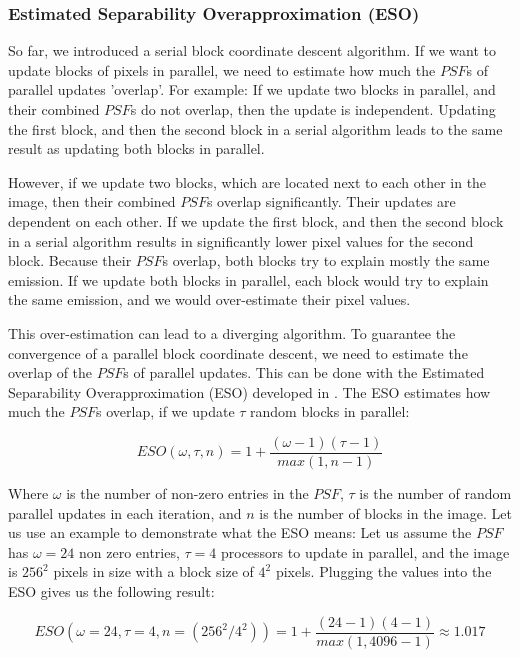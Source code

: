 \subsubsection{Estimated Separability Overapproximation (ESO)} \label{pcdm:pcdm:eso}
So far, we introduced a serial block coordinate descent algorithm. If we want to update blocks of pixels in parallel, we need to estimate how much the $PSF$s of parallel updates 'overlap'. For example: If we update two blocks in parallel, and their combined $PSF$s do not overlap, then the update is independent. Updating the first block, and then the second block in a serial algorithm leads to the same result as updating both blocks in parallel. 

However, if we update two blocks, which are located next to each other in the image, then their combined $PSF$s overlap significantly. Their updates are dependent on each other. If we update the first block, and then the second block in a serial algorithm results in significantly lower pixel values for the second block. Because their $PSF$s overlap, both blocks try to explain mostly the same emission. If we update both blocks in parallel, each block would try to explain the same emission, and we would over-estimate their pixel values.

This over-estimation can lead to a diverging algorithm. To guarantee the convergence of a parallel block coordinate descent, we need to estimate the overlap of the $PSF$s of parallel updates. This can be done with the Estimated Separability Overapproximation (ESO) developed in \cite{richtarik2016parallel}. The ESO estimates how much the $PSF$s overlap, if we update $\tau$ random blocks in parallel:

\begin{equation}\label{pcdm:pcdm:eso}
ESO(\omega, \tau, n) = 1+ \frac{(\omega - 1)(\tau - 1)}{max(1, n -1)}
\end{equation}

Where $\omega$ is the number of non-zero entries in the $PSF$, $\tau$ is the number of random parallel updates in each iteration, and $n$ is the number of blocks in the image. Let us use an example to demonstrate what the ESO means: Let us assume the $PSF$ has $\omega = 24$ non zero entries, $\tau = 4$ processors to update in parallel, and the image is $256^2$ pixels in size with a block size of $4^2$ pixels. Plugging the values into the ESO gives us the following result:

\begin{equation}
ESO(\omega = 24, \tau = 4, n = (256^2 / 4^2)) = 1+ \frac{(24 - 1)(4 - 1)}{max(1, 4096 -1)} \approx 1.017
\end{equation}

